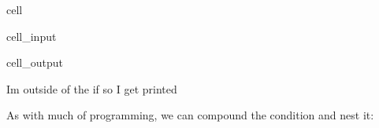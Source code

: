\documentclass[letterpaper,10pt,english]{jupyterBook}
\begin{document}
\begin{sphinxuseclass}{cell}\begin{sphinxVerbatimInput}

\begin{sphinxuseclass}{cell_input}
\begin{sphinxVerbatim}[commandchars=\\\{\}]
 
\end{sphinxVerbatim}

\end{sphinxuseclass}\end{sphinxVerbatimInput}
\begin{sphinxVerbatimOutput}

\begin{sphinxuseclass}{cell_output}
\begin{sphinxVerbatim}[commandchars=\\\{\}]
I\PYGZsq{}m outside of the if so I get printed
\end{sphinxVerbatim}

\end{sphinxuseclass}\end{sphinxVerbatimOutput}

\end{sphinxuseclass}
\sphinxAtStartPar
As with much of programming, we can compound the condition and nest it:
\end{document}
